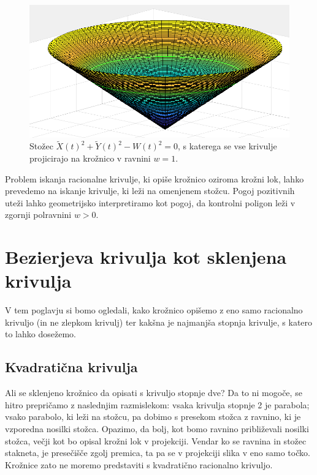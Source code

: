 \documentclass[a4paper,12pt]{article}
\begin{document}
\begin{figure}[h!]
\includegraphics[scale=0.25]{stozec.png}
\centering
\caption{Stožec $\tilde{X}(t)^2 + \tilde{Y}(t)^2 - W(t)^2 = 0$, s katerega se vse krivulje projicirajo na krožnico v ravnini $w=1$.}
\end{figure}

Problem iskanja racionalne krivulje, ki opiše krožnico oziroma krožni lok, lahko prevedemo na iskanje krivulje, ki leži na omenjenem stožcu. Pogoj pozitivnih uteži lahko geometrijsko interpretiramo kot pogoj, da kontrolni poligon leži v zgornji polravnini $w > 0$.

\section{Bezierjeva krivulja kot sklenjena krivulja}
V tem poglavju si bomo ogledali, kako krožnico opišemo z eno samo racionalno krivuljo (in ne zlepkom krivulj) ter kakšna je najmanjša stopnja krivulje, s katero to lahko dosežemo.

\subsection{Kvadratična krivulja}
Ali se sklenjeno krožnico da opisati s krivuljo stopnje dve? Da to ni mogoče, se hitro prepričamo z naslednjim razmislekom: vsaka krivulja stopnje 2 je parabola; vsako parabolo, ki leži na stožcu, pa dobimo s presekom stožca z ravnino, ki je vzporedna nosilki stožca. Opazimo, da bolj, kot bomo ravnino približevali nosilki stožca, večji kot bo opisal krožni lok v projekciji. Vendar ko se ravnina in stožec stakneta, je presečišče zgolj premica, ta pa se v projekciji slika v eno samo točko. Krožnice zato ne moremo predstaviti s kvadratično racionalno krivuljo.
\end{document}
